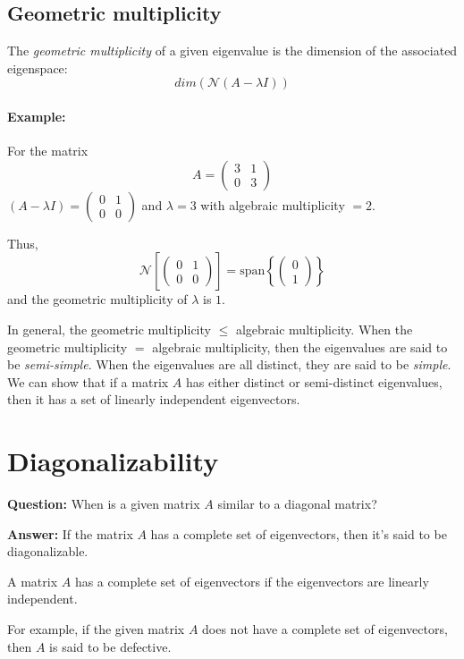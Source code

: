 \subsection{Geometric multiplicity}
The \textit{geometric multiplicity} of a given eigenvalue is the dimension of the associated eigenspace: $$dim(\mathcal{N}(A - \lambda I))$$
\paragraph{Example:}
For the matrix 
\[
A = 
\begin{pmatrix}
3 & 1 \\
0 & 3 
\end{pmatrix}
\]
$(A - \lambda I) = 
\begin{pmatrix}
0 & 1 \\
0 & 0 
\end{pmatrix}
$ and $\lambda = 3$ with algebraic multiplicity $= 2$.

Thus, 
\[
\mathcal{N}
\left[\begin{pmatrix}
0 & 1 \\
0 & 0 
\end{pmatrix}\right]
= \text{span} 
\left\{ \begin{pmatrix}
0 \\
1 
\end{pmatrix} \right\}
\]
and the geometric multiplicity of $\lambda$ is $1$.

In general, the geometric multiplicity $\leq$ algebraic multiplicity.
When the geometric multiplicity $=$ algebraic multiplicity, then the eigenvalues
are said to be \textit{semi-simple}. When the eigenvalues are all distinct,
they are said to be \textit{simple}. We can show that if a matrix $A$ has 
either distinct or semi-distinct eigenvalues, then it has a set of linearly
independent eigenvectors.

\section{Diagonalizability}

\textbf{Question:} When is a given matrix \( A \) similar to a diagonal matrix?

\textbf{Answer:} If the matrix \( A \) has a complete set of eigenvectors, then it's said to be diagonalizable.

A matrix \( A \) has a complete set of eigenvectors if the eigenvectors are linearly independent.

For example, if the given matrix \( A \) does not have a complete set of eigenvectors, then \( A \) is said to be defective.

